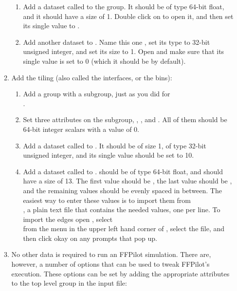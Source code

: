 \begin{enumerate}
\begin{enumerate}
\begin{enumerate}
            \item Add a dataset called  to the  group. It should be of type 64-bit float, and it should have a size of 1. Double click on  to open it, and then set its single value to .
            \item Add another dataset to . Name this one , set its type to 32-bit unsigned integer, and set its size to 1. Open  and make sure that its single value is set to 0 (which it should be by default).
        \end{enumerate}
        \item{Add the tiling (also called the interfaces, or the bins):}
        \begin{enumerate}
            \item Add a  group with a  subgroup, just as you did for \\
            .
            \item Set three attributes on the  subgroup, , , and . All of them should be 64-bit integer scalars with a value of 0.
            \item Add a dataset called  to . It should be of size 1, of type 32-bit unsigned integer, and its single value should be set to 10.
            \item Add a dataset called  to .  should be of type 64-bit float, and should have a size of 13. The first value should be , the last value should be , and the remaining values should be evenly spaced in between. The easiest way to enter these values is to import them from \\ , a plain text file that contains the needed values, one per line. To import the edges open , select \\  from the  menu in the upper left hand corner of , select the  file, and then click okay on any prompts that pop up.
        \end{enumerate}
        \item No other data is required to run an FFPilot simulation. There are, however, a number of options that can be used to tweak FFPilot's execution. These options can be set by adding the appropriate attributes to the top level  group in the input  file:

\end{enumerate}
\end{enumerate}
